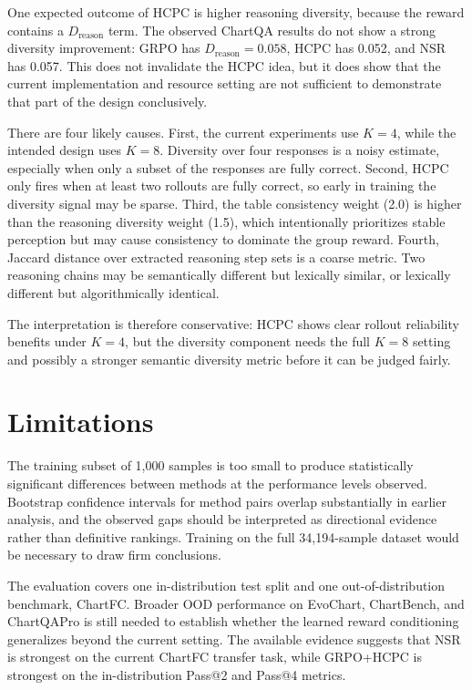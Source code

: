 \documentclass{iutbscthesis}
\begin{document}
One expected outcome of HCPC is higher reasoning diversity, because the reward contains a $D_{\text{reason}}$ term. The observed ChartQA results do not show a strong diversity improvement: GRPO has $D_{\text{reason}}=0.058$, HCPC has 0.052, and NSR has 0.057. This does not invalidate the HCPC idea, but it does show that the current implementation and resource setting are not sufficient to demonstrate that part of the design conclusively.

There are four likely causes. First, the current experiments use $K=4$, while the intended design uses $K=8$. Diversity over four responses is a noisy estimate, especially when only a subset of the responses are fully correct. Second, HCPC only fires when at least two rollouts are fully correct, so early in training the diversity signal may be sparse. Third, the table consistency weight (2.0) is higher than the reasoning diversity weight (1.5), which intentionally prioritizes stable perception but may cause consistency to dominate the group reward. Fourth, Jaccard distance over extracted reasoning step sets is a coarse metric. Two reasoning chains may be semantically different but lexically similar, or lexically different but algorithmically identical.

The interpretation is therefore conservative: HCPC shows clear rollout reliability benefits under $K=4$, but the diversity component needs the full $K=8$ setting and possibly a stronger semantic diversity metric before it can be judged fairly.

\section{Limitations}

The training subset of 1,000 samples is too small to produce statistically significant differences between methods at the performance levels observed. Bootstrap confidence intervals for method pairs overlap substantially in earlier analysis, and the observed gaps should be interpreted as directional evidence rather than definitive rankings. Training on the full 34,194-sample dataset would be necessary to draw firm conclusions.

The evaluation covers one in-distribution test split and one out-of-distribution benchmark, ChartFC. Broader OOD performance on EvoChart, ChartBench, and ChartQAPro is still needed to establish whether the learned reward conditioning generalizes beyond the current setting. The available evidence suggests that NSR is strongest on the current ChartFC transfer task, while GRPO+HCPC is strongest on the in-distribution Pass@2 and Pass@4 metrics.
\end{document}

